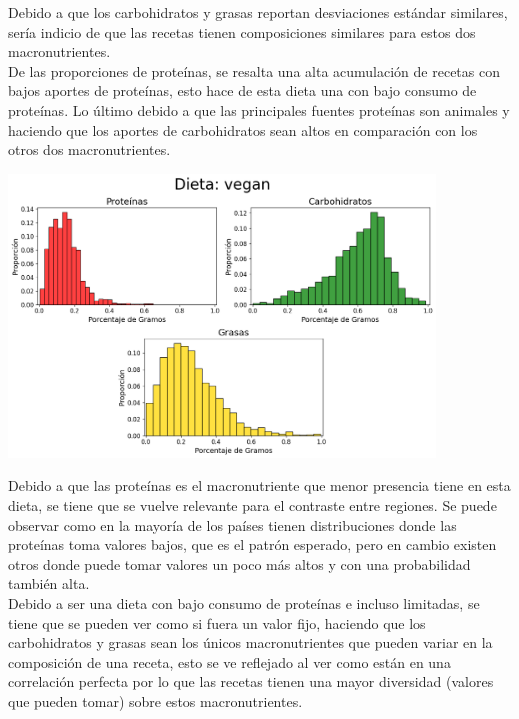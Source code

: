 \documentclass[12pt,a4paper]{article}
\begin{document}
            Debido a que los carbohidratos y grasas reportan desviaciones estándar 
            similares, sería indicio de que las recetas tienen composiciones similares 
            para estos dos macronutrientes.\\

            De las proporciones de proteínas, se resalta una alta acumulación de 
            recetas con bajos aportes de proteínas, esto hace de esta dieta una 
            con bajo consumo de proteínas. Lo último debido a que las principales 
            fuentes proteínas son animales y haciendo que los aportes de carbohidratos 
            sean altos en comparación con los otros dos macronutrientes.

            \begin{center}
                \includegraphics[width=0.85\textwidth]{Resources/2_03_plot_05.png}
            \end{center}

            Debido a que las proteínas es el macronutriente que menor presencia tiene 
            en esta dieta, se tiene que se vuelve relevante para el contraste entre regiones. 
            Se puede observar como en la mayoría de los países tienen distribuciones donde 
            las proteínas toma valores bajos, que es el patrón esperado, pero en cambio 
            existen otros donde puede tomar valores un poco más altos y con una probabilidad 
            también alta.\\

            Debido a ser una dieta con bajo consumo de proteínas e incluso limitadas, se tiene 
            que se pueden ver como si fuera un valor fijo, haciendo que los carbohidratos y 
            grasas sean los únicos macronutrientes que pueden variar en la composición de una 
            receta, esto se ve reflejado al ver como están en una correlación perfecta por lo 
            que las recetas tienen una mayor diversidad (valores que pueden tomar) sobre estos 
            macronutrientes.
\end{document}
